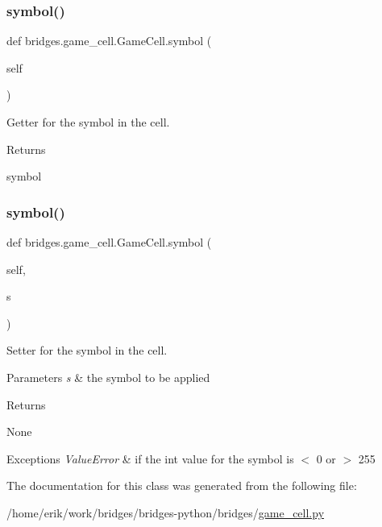 \subsubsection{\texorpdfstring{symbol()}{symbol()}\hspace{0.1cm}{\footnotesize\ttfamily [1/2]}}
{\footnotesize\ttfamily def bridges.\+game\+\_\+cell.\+Game\+Cell.\+symbol (\begin{DoxyParamCaption}\item[{}]{self }\end{DoxyParamCaption})}



Getter for the symbol in the cell. 

\begin{DoxyReturn}{Returns}


symbol 
\end{DoxyReturn}
\mbox{\label{classbridges_1_1game__cell_1_1_game_cell_a2ce9aa7d7d7835c511338c65a1457e22}} 
\subsubsection{\texorpdfstring{symbol()}{symbol()}\hspace{0.1cm}{\footnotesize\ttfamily [2/2]}}
{\footnotesize\ttfamily def bridges.\+game\+\_\+cell.\+Game\+Cell.\+symbol (\begin{DoxyParamCaption}\item[{}]{self,  }\item[{}]{s }\end{DoxyParamCaption})}



Setter for the symbol in the cell. 


\begin{DoxyParams}{Parameters}
{\em s} & the symbol to be applied \\
\hline
\end{DoxyParams}
\begin{DoxyReturn}{Returns}


None
\end{DoxyReturn}

\begin{DoxyExceptions}{Exceptions}
{\em Value\+Error} & if the int value for the symbol is $<$ 0 or $>$ 255 \\
\hline
\end{DoxyExceptions}


The documentation for this class was generated from the following file\+:\begin{DoxyCompactItemize}
\item 
/home/erik/work/bridges/bridges-\/python/bridges/\hyperlink{game__cell_8py}{game\+\_\+cell.\+py}\end{DoxyCompactItemize}
